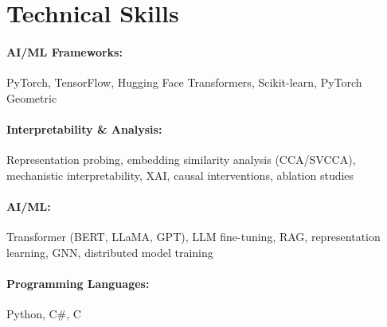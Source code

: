 \documentclass[10pt, letterpaper]{article}
\newenvironment{onecolentry}{
    \begin{adjustwidth}{
        0 cm + 0.00001 cm
    }{
        0 cm + 0.00001 cm
    }
}{
    \end{adjustwidth}
} %
\begin{document}
        




\vspace{-1mm}
\section{Technical Skills}

        \paragraph{AI/ML Frameworks:} PyTorch, TensorFlow, Hugging Face Transformers, Scikit-learn, PyTorch Geometric
        \vspace{-4mm}
        \paragraph{Interpretability \& Analysis:} Representation probing, embedding similarity analysis (CCA/SVCCA), mechanistic interpretability, XAI, causal interventions, ablation studies
        \vspace{-4mm}
        \paragraph{AI/ML:} Transformer (BERT, LLaMA, GPT), LLM fine-tuning, RAG, representation learning, GNN, distributed model training
        \vspace{-4mm}
        \paragraph{Programming Languages:} Python, C\#, C
        \vspace{-4mm}
\end{document}
